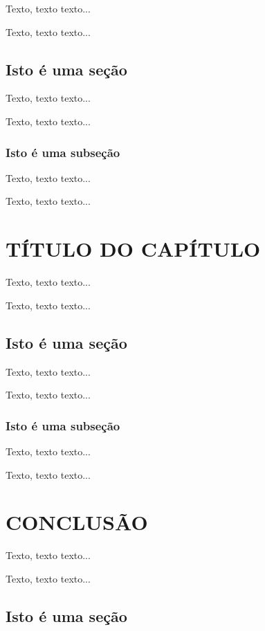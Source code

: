 \documentclass[12pt, a4paper]{report}
\theoremstyle{remark}
\theoremstyle{definition}
\theoremstyle{definition}
\theoremstyle{plain}
\theoremstyle{plain}
\theoremstyle{plain}
\theoremstyle{definition}
\begin{document}
Texto, texto texto...

Texto, texto texto...

\section{Isto é uma seção}

Texto, texto texto...

Texto, texto texto...

\subsection{Isto é uma subseção}

Texto, texto texto...

Texto, texto texto...


\chapter{TÍTULO DO CAPÍTULO}
\thispagestyle{myheadings}

Texto, texto texto...

Texto, texto texto...

\section{Isto é uma seção}

Texto, texto texto...

Texto, texto texto...

\subsection{Isto é uma subseção}

Texto, texto texto...

Texto, texto texto...


\chapter{CONCLUSÃO}
\thispagestyle{myheadings}

Texto, texto texto...

Texto, texto texto...

\section{Isto é uma seção}
\end{document}
